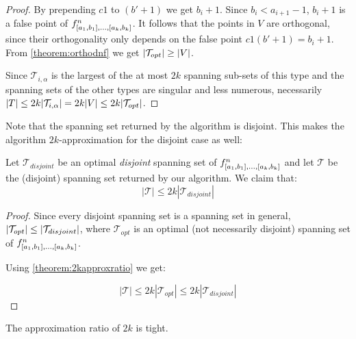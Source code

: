 \begin{proof}
By prepending $c 1$ to $(b' + 1)$
we get $b_i + 1$.
Since $b_i < a_{i+1} - 1$,
$b_i + 1$ is a false point of
$f^n_{[a_1, b_1], \ldots, [a_k, b_k]}$.
It follows that the points in $V$ are orthogonal,
since their orthogonality only depends on the false point
$c 1 (b' + 1) = b_i + 1$.
From \autoref{theorem:orthodnf} we get
$\lvert\mathcal{T}_{opt}\rvert \geq \lvert V\rvert$.

Since $\mathcal{T}_{i, \alpha}$ is
the largest of the at most $2k$ spanning sub-sets
of this type
and the spanning sets of the other types are singular
and less numerous,
necessarily
$\lvert T\rvert \leq 2k \lvert\mathcal{T}_{i, \alpha}\rvert
= 2k \lvert V\rvert \leq 2k \lvert\mathcal{T}_{opt}\rvert$.
\end{proof}

Note that the spanning set returned by the algorithm
is disjoint.
This makes the algorithm $2k$-approximation
for the disjoint case as well:

\begin{theorem}
Let $\mathcal{T}_{disjoint}$ be an optimal \emph{disjoint}
spanning set of
$f^n_{[a_1, b_1], \ldots, [a_k, b_k]}$
and let $\mathcal{T}$ be the (disjoint)
spanning set returned by our algorithm.
We claim that:
\begin{equation*}
|\mathcal{T}| \leq 2k |\mathcal{T}_{disjoint}|
\end{equation*}
\end{theorem}

\begin{proof}
Since every disjoint spanning set
is a spanning set in general,
$\lvert\mathcal{T}_{opt}\rvert \leq
\lvert\mathcal{T}_{disjoint}\rvert$,
where $\mathcal{T}_{opt}$ is an optimal
(not necessarily disjoint)
spanning set of
$f^n_{[a_1, b_1], \ldots, [a_k, b_k]}$.

Using \autoref{theorem:2kapproxratio} we get:

\begin{equation*}
|\mathcal{T}| \leq 2k |\mathcal{T}_{opt}|
\leq 2k |\mathcal{T}_{disjoint}|
\end{equation*}
\end{proof}

\begin{theorem}
\label{theorem:2kapproxtight}
The approximation ratio of $2k$ is tight.
\end{theorem}

